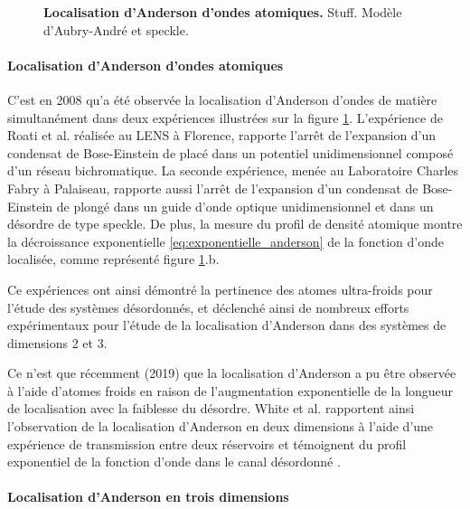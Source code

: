 \begin{figure}
\centering

\caption{\textbf{Localisation d'Anderson d'ondes atomiques.} Stuff. Modèle d'Aubry-André et speckle.}
\label{fig:localisation_1D_atomes_froids}
\end{figure}




\paragraph*{Localisation d'Anderson d'ondes atomiques}
C'est en 2008 qu'a été observée la localisation d'Anderson d'ondes de matière simultanément dans deux expériences illustrées sur la figure \ref{fig:localisation_1D_atomes_froids}. L'expérience de Roati et al. \citep{roati2008anderson} réalisée au LENS à Florence, rapporte l'arrêt de l'expansion d'un condensat de Bose-Einstein de  placé dans un potentiel unidimensionnel composé d'un réseau bichromatique. La seconde expérience, menée au Laboratoire Charles Fabry à Palaiseau, rapporte aussi l'arrêt de l'expansion d'un condensat de Bose-Einstein de  plongé dans un guide d'onde optique unidimensionnel et dans un désordre de type speckle. De plus, la mesure du profil de densité atomique montre la décroissance exponentielle \ref{eq:exponentielle_anderson} de la fonction d'onde localisée, comme représenté figure \ref{fig:localisation_1D_atomes_froids}.b. 

Ce expériences ont ainsi démontré la pertinence des atomes ultra-froids pour l'étude des systèmes désordonnés, et déclenché ainsi de nombreux efforts expérimentaux pour l'étude de la localisation d'Anderson dans des systèmes de dimensions 2 et 3. 

Ce n'est que récemment (2019) que la localisation d'Anderson a pu être observée à l'aide d'atomes froids en raison de l'augmentation exponentielle de la longueur de localisation avec la faiblesse du désordre. White et al. rapportent ainsi l'observation de la localisation d'Anderson en deux dimensions à l'aide d'une expérience de transmission entre deux réservoirs et témoignent du profil exponentiel de la fonction d'onde dans le canal désordonné \citep{white2019observation}. 



\paragraph*{Localisation d'Anderson en trois dimensions}

